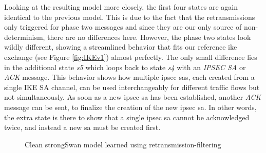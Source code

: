 Looking at the resulting model more closely, the first four states are again identical to the previous model. This is due to the fact that the retransmissions only triggered for phase two messages and since they are our only source of non-determinism, there are no differences here. However, the phase two states look wildly different, showing a streamlined behavior that fits our reference \ac{ike} exchange (see Figure \ref{fig:IKEv1}) almost perfectly. The only small difference lies in the additional state \emph{s5} which loops back to state \emph{s4} with an \emph{IPSEC SA} or \emph{ACK} message. This behavior shows how multiple \ac{ipsec} \acp{sa}, each created from a single IKE SA channel, can be used interchangeably for different traffic flows but not simultaneously. As soon as a new \ac{ipsec} \ac{sa} has been established, another \emph{ACK} message can be sent, to finalize the creation of the new \ac{ipsec} \ac{sa}. In other words, the extra state is there to show that a single \ac{ipsec} \ac{sa} cannot be acknowledged twice, and instead a new \ac{sa} must be created first. 

\begin{figure}[ht]
	\vspace*{\fill}
	\noindent
	\hspace*{-5.5\oddsidemargin}%
	\caption{Clean strongSwan model learned using retransmission-filtering}
	\label{fig:reference}
	\vspace*{\fill}
\end{figure}

